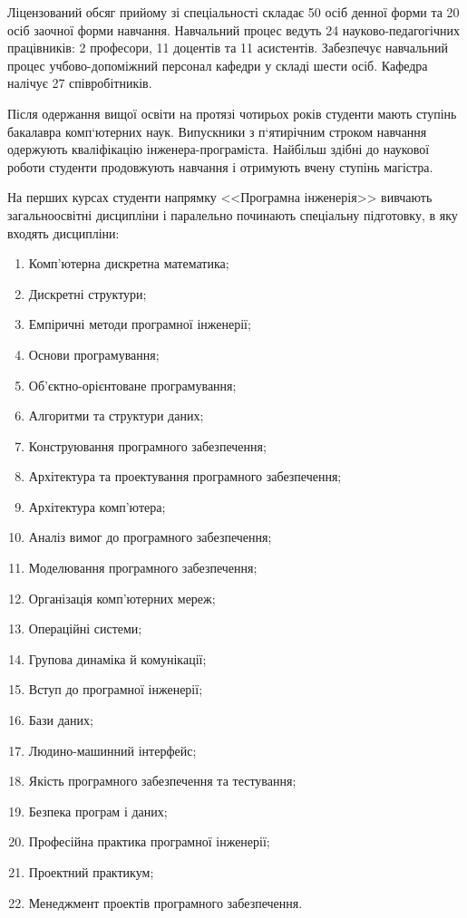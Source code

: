 Ліцензований обсяг прийому зі спеціальності складає 50 осіб денної форми та 20 осіб заочної форми навчання.
Навчальний процес ведуть 24 науково-педагогічних працівників: 2 професори, 11 доцентів та 11 асистентів. Забезпечує навчальний процес учбово-допоміжний персонал кафедри у складі шести осіб. Кафедра налічує 27 співробітників.

Після одержання вищої освіти на протязі чотирьох років студенти мають ступінь бакалавра комп`ютерних наук. Випускники з п`ятирічним строком навчання одержують кваліфікацію інженера-програміста. Найбільш здібні до наукової роботи студенти продовжують навчання і отримують вчену ступінь магістра.

На перших курсах студенти напрямку <<Програмна інженерія>> вивчають загальноосвітні дисципліни і паралельно починають спеціальну підготовку, в яку входять дисципліни:
\begin{enumerate}
\item Комп'ютерна дискретна математика;
\item Дискретні структури;
\item Емпіричні методи програмної інженерії;
\item Основи програмування;
\item Об’єктно-орієнтоване програмування;
\item Алгоритми та структури даних;
\item Конструювання програмного забезпечення;
\item Архітектура та проектування програмного забезпечення;
\item Архітектура комп'ютера;
\item Аналіз вимог до програмного забезпечення;
\item Моделювання програмного забезпечення;
\item Організація комп'ютерних мереж;
\item Операційні системи;
\item Групова динаміка й комунікації;
\item Вступ до програмної інженерії;
\item Бази даних;
\item Людино-машинний інтерфейс;
\item Якість програмного забезпечення та тестування;
\item Безпека програм і даних;
\item Професійна практика програмної інженерії;
\item Проектний практикум;
\item Менеджмент проектів програмного забезпечення.
\end{enumerate}

